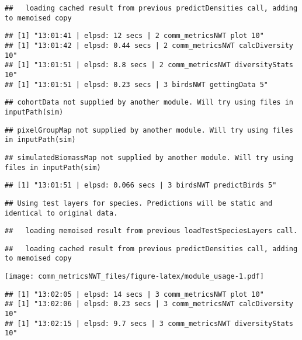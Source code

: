 \documentclass[]{article}
\begin{document}
\begin{verbatim}
##   loading cached result from previous predictDensities call, adding to memoised copy
\end{verbatim}

\begin{verbatim}
## [1] "13:01:41 | elpsd: 12 secs | 2 comm_metricsNWT plot 10"
## [1] "13:01:42 | elpsd: 0.44 secs | 2 comm_metricsNWT calcDiversity 10"
## [1] "13:01:51 | elpsd: 8.8 secs | 2 comm_metricsNWT diversityStats 10"
## [1] "13:01:51 | elpsd: 0.23 secs | 3 birdsNWT gettingData 5"
\end{verbatim}

\begin{verbatim}
## cohortData not supplied by another module. Will try using files in inputPath(sim)
\end{verbatim}

\begin{verbatim}
## pixelGroupMap not supplied by another module. Will try using files in inputPath(sim)
\end{verbatim}

\begin{verbatim}
## simulatedBiomassMap not supplied by another module. Will try using files in inputPath(sim)
\end{verbatim}

\begin{verbatim}
## [1] "13:01:51 | elpsd: 0.066 secs | 3 birdsNWT predictBirds 5"
\end{verbatim}

\begin{verbatim}
## Using test layers for species. Predictions will be static and identical to original data.
\end{verbatim}

\begin{verbatim}
##   loading memoised result from previous loadTestSpeciesLayers call.
\end{verbatim}

\begin{verbatim}
##   loading cached result from previous predictDensities call, adding to memoised copy
\end{verbatim}

\texttt{[image: comm\_metricsNWT\_files/figure-latex/module\_usage-1.pdf]}

\begin{verbatim}
## [1] "13:02:05 | elpsd: 14 secs | 3 comm_metricsNWT plot 10"
## [1] "13:02:06 | elpsd: 0.23 secs | 3 comm_metricsNWT calcDiversity 10"
## [1] "13:02:15 | elpsd: 9.7 secs | 3 comm_metricsNWT diversityStats 10"
\end{verbatim}
\end{document}
